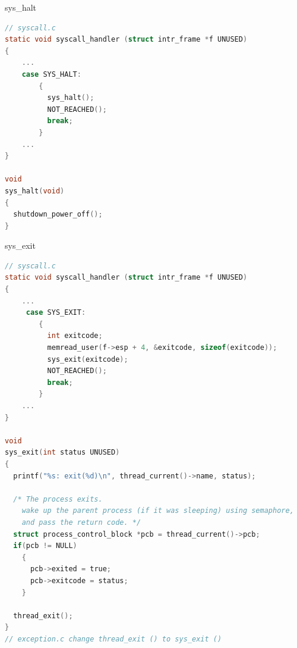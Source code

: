\documentclass[10pt]{beamer}
\begin{document}
\begin{frame}[fragile]{sys\_halt}
    \begin{lstlisting}[language=C]
// syscall.c
static void syscall_handler (struct intr_frame *f UNUSED) 
{
    ...
    case SYS_HALT:
        {
          sys_halt();
          NOT_REACHED();
          break;
        }
    ...
}

void 
sys_halt(void) 
{
  shutdown_power_off();
}
    \end{lstlisting}
\end{frame}
\begin{frame}[fragile]{sys\_exit}
    \begin{lstlisting}[language=C]
// syscall.c
static void syscall_handler (struct intr_frame *f UNUSED) 
{
    ...
     case SYS_EXIT:
        {
          int exitcode;
          memread_user(f->esp + 4, &exitcode, sizeof(exitcode));
          sys_exit(exitcode);
          NOT_REACHED();
          break;
        }
    ...
}

void 
sys_exit(int status UNUSED) 
{
  printf("%s: exit(%d)\n", thread_current()->name, status);

  /* The process exits.
    wake up the parent process (if it was sleeping) using semaphore,
    and pass the return code. */
  struct process_control_block *pcb = thread_current()->pcb;
  if(pcb != NULL) 
    {
      pcb->exited = true;
      pcb->exitcode = status;
    }

  thread_exit();
}
// exception.c change thread_exit () to sys_exit ()
    \end{lstlisting}
\end{frame}
\end{document}
